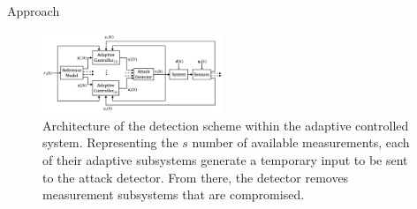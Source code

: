 \begin{section}{Approach}
\begin{figure}[ht!]
\vspace{1pt}
\centering
\includegraphics[width=0.48\textwidth]{con_and_det.png}
\caption{Architecture of the detection scheme within the adaptive controlled system. Representing  the $s$ number of available measurements, each of their adaptive subsystems generate a temporary input to be sent to the attack detector. From there, the detector removes measurement subsystems that are compromised.}
\label{fig:det_arch}
\end{figure}


\end{section}
